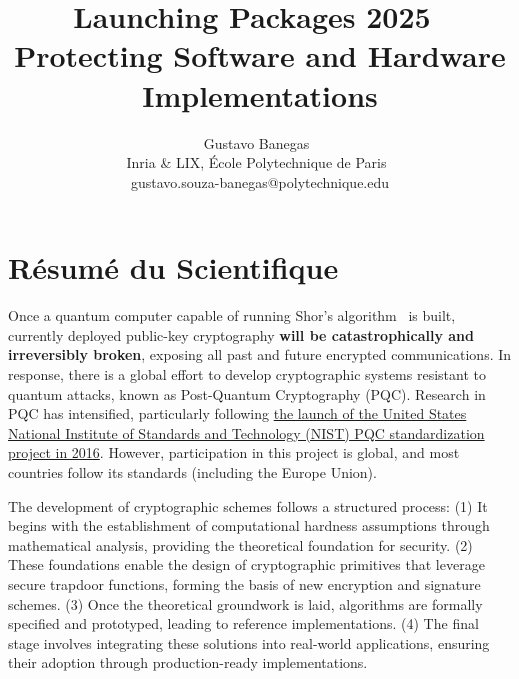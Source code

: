 \documentclass[11pt, a4paper]{article}
\begin{document}
\title{Launching Packages 2025~\\Protecting Software and  Hardware Implementations}
\author{Gustavo Banegas~\\
 Inria \& LIX, École Polytechnique de Paris~\\
 gustavo.souza-banegas@polytechnique.edu}
\date{}
\maketitle

\section{Résumé du Scientifique}

Once a quantum computer capable of running Shor’s algorithm~\cite{365700} is built, 
currently deployed public-key cryptography \textbf{will be catastrophically and irreversibly broken}, 
exposing all past and future encrypted communications. In response, there is a global effort to 
develop cryptographic systems resistant to quantum attacks, known as Post-Quantum Cryptography (PQC). 
Research in PQC has intensified, particularly following 
\href{https://csrc.nist.gov/projects/post-quantum-cryptography/post-quantum-cryptography-standardization/call-for-proposals}
{the launch of the United States National Institute of Standards and Technology (NIST) PQC standardization project in 2016}. 
However, participation in this project is global, and most countries follow its standards (including 
the Europe Union).

The development of cryptographic schemes follows a structured process: (1) It begins with the establishment of computational hardness assumptions through 
mathematical analysis, providing the theoretical foundation for security.
(2) These foundations enable the design of cryptographic primitives that leverage secure trapdoor functions, 
forming the basis of new encryption and signature schemes.
(3) Once the theoretical groundwork is laid, algorithms are formally specified and prototyped, leading to 
reference implementations. 
(4) The final stage involves integrating these solutions into real-world applications, ensuring their adoption 
through production-ready implementations.
\end{document}
